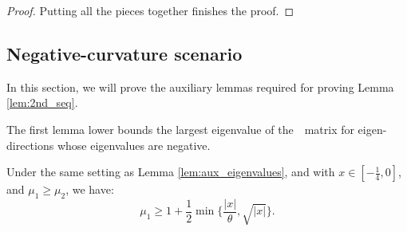 \begin{proof}

\noindent
Putting all the pieces together finishes the proof.
\end{proof}




\subsection{Negative-curvature scenario}
In this section, we will prove the auxiliary lemmas required for 
proving Lemma \ref{lem:2nd_seq}. 

The first lemma lower bounds the largest eigenvalue of 
the~\nag~matrix for eigen-directions whose eigenvalues are negative.
\begin{lemma}\label{lem:aux_negcurve_mu1}
Under the same setting as Lemma \ref{lem:aux_eigenvalues}, and 
with $x \in [-\frac{1}{4}, 0]$, and $\mu_1 \ge \mu_2$, we have:
\begin{equation*}
\mu_1 \ge 1 + \frac{1}{2}\min\{\frac{|x|}{\theta}, \sqrt{|x|}\}.
\end{equation*}
\end{lemma}

